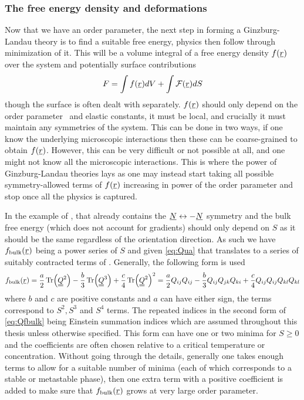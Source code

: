 \documentclass[12pt]{article}
\newcommand{\suf}[2]{\stackunder[1pt]{\ensuremath{#1}}{\rule{\widthof{\ensuremath{#2}}*\real{0.9}}{.1ex}}}
\newcommand{\duf}[2]{\stackunder[1pt]{\suf{\ensuremath{#1}}{#2}}{\rule{\widthof{\ensuremath{#2}}*\real{0.9}}{.1ex}}}
\newcommand{\su}[1]{\suf{#1}{#1}}
\newcommand{\du}[1]{\duf{#1}{#1}}
\newcommand{\QQ}{\du{Q}}
\begin{document}
\subsubsection{The free energy density and deformations}
Now that we have an order parameter, the next step in forming a Ginzburg-Landau theory is to find a suitable free energy, physics then follow through minimization of it.
This will be a volume integral of a free energy density $f(\su{r})$ over the system and potentially surface contributions
\begin{equation}
    F = \int f(\su{r}) dV + \int \mathcal{F}(\su{r}) dS
\end{equation}
though the surface is often dealt with separately.
$f(\su{r})$ should only depend on the order parameter \QQ\ and elastic constants, it must be local, and crucially it must maintain any symmetries of the system\cite{kardarStatisticalPhysicsFields2007,reichlModernCourseStatistical2016}.
This can be done in two ways, if one know the underlying microscopic interactions then these can be coarse-grained to obtain $f(\su{r})$.
However, this can be very difficult or not possible at all, and one might not know all the microscopic interactions.
This is where the power of Ginzburg-Landau theories lays as one may instead start taking all possible symmetry-allowed terms of $f(\su{r})$ increasing in power of the order parameter and stop once all the physics is captured.

In the example of \QQ, that already contains the $\su{N} \leftrightarrow -\su{N}$ symmetry and the bulk free energy (which does not account for gradients) should only depend on $S$ as it should be the same regardless of the orientation direction.
As such we have $f_\text{bulk}(\su{r})$ being a power series of $S$ and given \cref{eq:Qua} that translates to a series of suitably contracted terms of \QQ.
Generally, the following form is used
\begin{equation}\label{eq:Qfbulk}
    f_\text{bulk}(\su{r}) = \frac{a}{2} \Tr(\du{Q}^2) - \frac{b}{3} \Tr(\du{Q}^3) + \frac{c}{4} \Tr(\du{Q}^2)^2 = \frac{a}{2} Q_{ij}Q_{ij} - \frac{b}{3} Q_{ij}Q_{jk}Q_{ki} + \frac{c}{4} Q_{ij}Q_{ij}Q_{kl}Q_{kl}
\end{equation}
where $b$ and $c$ are positive constants and $a$ can have either sign, the terms correspond to $S^2, S^3$ and $S^4$ terms\cite{brayTheoryPhaseOrdering1993,luckhurstBiaxialNematicLiquid2015}.
The repeated indices in the second form of \cref{eq:Qfbulk} being Einstein summation indices which are assumed throughout this thesis unless otherwise specified.
This form can have one or two minima for $S\geq0$ and the coefficients are often chosen relative to a critical temperature or concentration.
Without going through the details, generally one takes enough terms to allow for a suitable number of minima (each of which corresponds to a stable or metastable phase), then one extra term with a positive coefficient is added to make sure that $f_\text{bulk}(\su{r})$ grows at very large order parameter.
\end{document}

